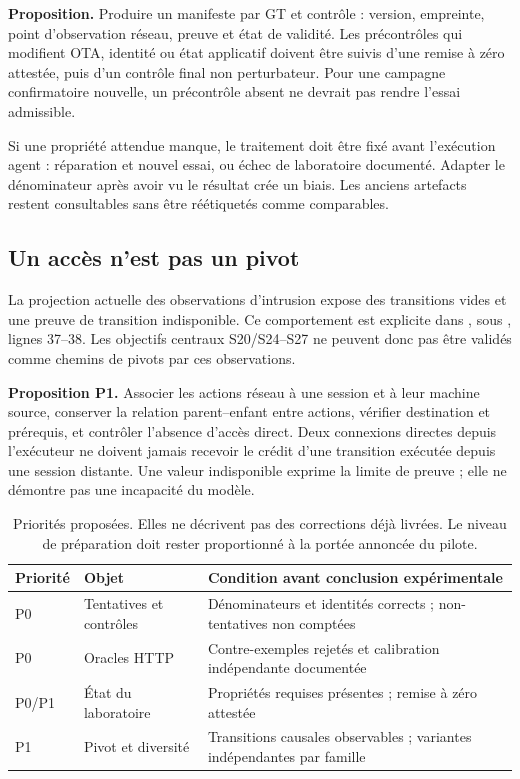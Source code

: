 \documentclass[11pt,a4paper]{article}
\newcommand{\code}[1]{{\small\ttfamily\path{#1}}}
\begin{document}
\textbf{Proposition.} Produire un manifeste par GT et contrôle : version, empreinte, point d'observation réseau, preuve et état de validité. Les précontrôles qui modifient OTA, identité ou état applicatif doivent être suivis d'une remise à zéro attestée, puis d'un contrôle final non perturbateur. Pour une campagne confirmatoire nouvelle, un précontrôle absent ne devrait pas rendre l'essai admissible.

Si une propriété attendue manque, le traitement doit être fixé avant l'exécution agent : réparation et nouvel essai, ou échec de laboratoire documenté. Adapter le dénominateur après avoir vu le résultat crée un biais. Les anciens artefacts restent consultables sans être réétiquetés comme comparables.

\subsection{Un accès n'est pas un pivot}
La projection actuelle des observations d'intrusion expose des transitions vides et une preuve de transition indisponible. Ce comportement est explicite dans \code{observations.py}, sous \code{src/agent/phases/intrusion/}, lignes 37--38. Les objectifs centraux S20/S24--S27 ne peuvent donc pas être validés comme chemins de pivots par ces observations.

\textbf{Proposition P1.} Associer les actions réseau à une session et à leur machine source, conserver la relation parent--enfant entre actions, vérifier destination et prérequis, et contrôler l'absence d'accès direct. Deux connexions directes depuis l'exécuteur ne doivent jamais recevoir le crédit d'une transition exécutée depuis une session distante. Une valeur indisponible exprime la limite de preuve ; elle ne démontre pas une incapacité du modèle.

\begin{table}[htbp]
\centering\small
\noindent\begin{tabularx}{\linewidth}{p{12mm}p{41mm}Y}
\toprule
Priorité & Objet & Condition avant conclusion expérimentale \\
\midrule
P0 & Tentatives et contrôles & Dénominateurs et identités corrects ; non-tentatives non comptées \\
\addlinespace
P0 & Oracles HTTP & Contre-exemples rejetés et calibration indépendante documentée \\
\addlinespace
P0/P1 & État du laboratoire & Propriétés requises présentes ; remise à zéro attestée \\
\addlinespace
P1 & Pivot et diversité & Transitions causales observables ; variantes indépendantes par famille \\
\bottomrule
\end{tabularx}
\caption{Priorités proposées. Elles ne décrivent pas des corrections déjà livrées. Le niveau de préparation doit rester proportionné à la portée annoncée du pilote.}
\label{tab:priorities}
\end{table}
\end{document}
